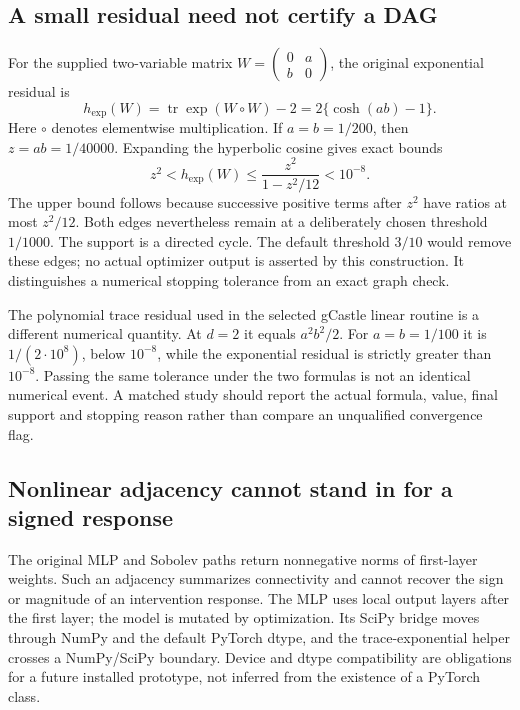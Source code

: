 \subsection{A small residual need not certify a DAG}
\label{exec23:notears-residual}
For the supplied two-variable matrix
$W=\left(\begin{smallmatrix}0&a\\b&0\end{smallmatrix}\right)$,
the original exponential residual is
\begin{equation}
 h_{\exp}(W)=\operatorname{tr}\exp(W\circ W)-2
            =2\{\cosh(ab)-1\}.
 \label{exec23:notears-cycle}
\end{equation}
Here $\circ$ denotes elementwise multiplication. If $a=b=1/200$,
then $z=ab=1/40000$. Expanding the hyperbolic cosine gives exact bounds
\begin{equation}
 z^2<h_{\exp}(W)\leq\frac{z^2}{1-z^2/12}<10^{-8}.
 \label{exec23:notears-bound}
\end{equation}
The upper bound follows because successive positive terms after $z^2$
have ratios at most $z^2/12$. Both edges nevertheless remain at a deliberately
chosen threshold $1/1000$. The support is a directed cycle. The default
threshold $3/10$ would remove these edges; no actual optimizer output is
asserted by this construction. It distinguishes a numerical stopping
tolerance from an exact graph check.
\citep{exec23_notears_source,exec23_notears_reference}

The polynomial trace residual used in the selected gCastle linear routine
is a different numerical quantity. At $d=2$ it equals $a^2b^2/2$.
For $a=b=1/100$ it is $1/(2\cdot10^8)$, below $10^{-8}$,
while the exponential residual is strictly greater than $10^{-8}$.
Passing the same tolerance under the two formulas is not an identical
numerical event. A matched study should report the actual formula, value,
final support and stopping reason rather than compare an unqualified
convergence flag.~\citep{exec20_gcastle_source,exec23_notears_reference}

\subsection{Nonlinear adjacency cannot stand in for a signed response}
\label{exec23:notears-nonlinear}
The original MLP and Sobolev paths return nonnegative norms of first-layer
weights. Such an adjacency summarizes connectivity and cannot recover the
sign or magnitude of an intervention response. The MLP uses local output
layers after the first layer; the model is mutated by optimization. Its
SciPy bridge moves through NumPy and the default PyTorch dtype, and the
trace-exponential helper crosses a NumPy/SciPy boundary. Device and dtype
compatibility are obligations for a future installed prototype, not inferred
from the existence of a PyTorch class.~\citep{exec23_notears_source}

